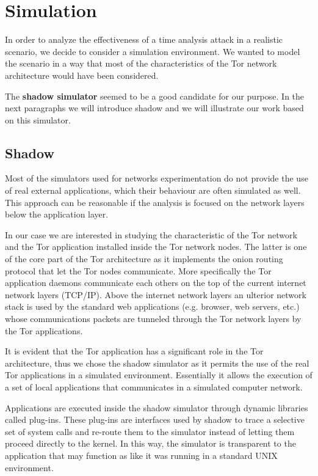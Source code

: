 \section{Simulation}
\label{sec:simulation}
In order to analyze the effectiveness of a time analysis attack in a
realistic scenario, we decide to consider a simulation environment.
We wanted to model the scenario in a way that most of the
characteristics of the Tor network architecture would have been
considered.

The \textbf{shadow simulator}\cite{shadow} seemed to be a good candidate for our purpose. In
the next paragraphs we will introduce shadow and we will illustrate our
work based on this simulator.
 
\subsection{Shadow}
Most of the simulators used for networks experimentation do not provide
the use of real external applications, which their
behaviour are often simulated as well. 
This approach can be reasonable if the analysis is focused on the 
network layers below the application layer. 

In our case we are interested in studying the characteristic of the Tor
network and the Tor application installed inside the Tor network nodes.
The latter is one of the core part of the Tor architecture as it implements the
onion routing protocol that let the Tor nodes communicate. More
specifically the Tor application daemons communicate each others on the 
top of the current internet network layers (TCP/IP). Above the internet
network layers an ulterior network stack is used by the standard web applications 
(e.g. browser, web servers, etc.) whose communications packets are
tunneled through the Tor network layers by the Tor applications.

It is evident that the Tor application has a significant role in
the Tor architecture, thus we chose the shadow simulator as it permits
the use of the real Tor applications in a simulated environment.
Essentially it allows the execution of a set of local applications that
communicates in a simulated computer network.

Applications are executed inside the shadow simulator through 
dynamic libraries called plug-ins. 
These plug-ins are interfaces used by shadow to trace a
selective set of system calls and re-route them to the simulator instead
of letting them proceed directly to the kernel. 
In this way, the simulator is transparent to the application
that may function as like it was running in a standard UNIX environment. 

